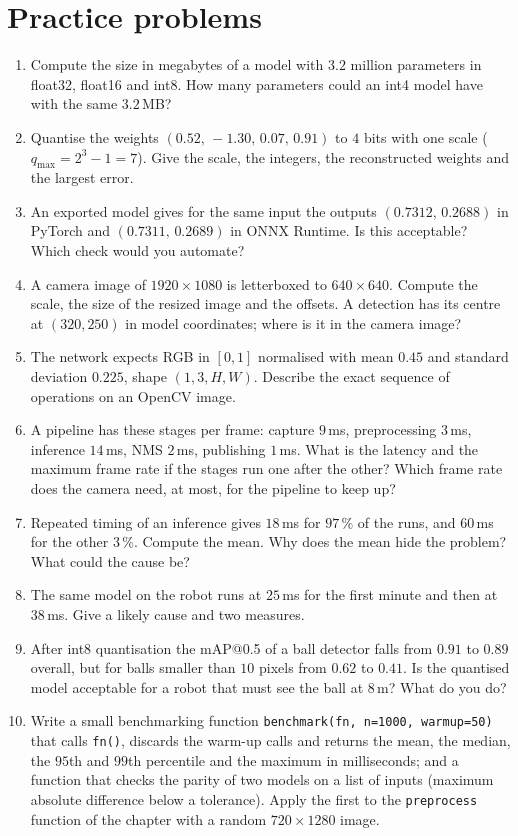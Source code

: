 \section*{Practice problems}
\begin{enumerate}[label=\textbf{\thechapter.\arabic*}]
  \item Compute the size in megabytes of a model with $3.2$ million parameters in float32, float16 and int8. How many parameters could an int4 model have with the same $3.2$\,MB?
  \item Quantise the weights $(0.52,\,-1.30,\,0.07,\,0.91)$ to $4$ bits with one scale ($q_\text{max}=2^{3}-1=7$). Give the scale, the integers, the reconstructed weights and the largest error.
  \item An exported model gives for the same input the outputs $(0.7312,\,0.2688)$ in PyTorch and $(0.7311,\,0.2689)$ in ONNX Runtime. Is this acceptable? Which check would you automate?
  \item A camera image of $1920\times1080$ is letterboxed to $640\times640$. Compute the scale, the size of the resized image and the offsets. A detection has its centre at $(320,250)$ in model coordinates; where is it in the camera image?
  \item The network expects RGB in $[0,1]$ normalised with mean $0.45$ and standard deviation $0.225$, shape $(1,3,H,W)$. Describe the exact sequence of operations on an OpenCV image.
  \item A pipeline has these stages per frame: capture $9$\,ms, preprocessing $3$\,ms, inference $14$\,ms, NMS $2$\,ms, publishing $1$\,ms. What is the latency and the maximum frame rate if the stages run one after the other? Which frame rate does the camera need, at most, for the pipeline to keep up?
  \item Repeated timing of an inference gives $18$\,ms for $97\,\%$ of the runs, and $60$\,ms for the other $3\,\%$. Compute the mean. Why does the mean hide the problem? What could the cause be?
  \item The same model on the robot runs at $25$\,ms for the first minute and then at $38$\,ms. Give a likely cause and two measures.
  \item After int8 quantisation the mAP@0.5 of a ball detector falls from $0.91$ to $0.89$ overall, but for balls smaller than $10$ pixels from $0.62$ to $0.41$. Is the quantised model acceptable for a robot that must see the ball at $8$\,m? What do you do?
  \item[\textbf{\thechapter.10}$\star$] Write a small benchmarking function \texttt{benchmark(fn, n=1000, warmup=50)} that calls \texttt{fn()}, discards the warm-up calls and returns the mean, the median, the $95$th and $99$th percentile and the maximum in milliseconds; and a function that checks the parity of two models on a list of inputs (maximum absolute difference below a tolerance). Apply the first to the \texttt{preprocess} function of the chapter with a random $720\times1280$ image.
\end{enumerate}
